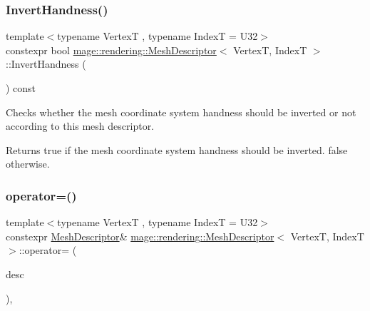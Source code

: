 \subsubsection{\texorpdfstring{Invert\+Handness()}{InvertHandness()}}
{\footnotesize\ttfamily template$<$typename VertexT , typename IndexT  = U32$>$ \\
constexpr bool \hyperlink{classmage_1_1rendering_1_1_mesh_descriptor}{mage\+::rendering\+::\+Mesh\+Descriptor}$<$ VertexT, IndexT $>$\+::Invert\+Handness (\begin{DoxyParamCaption}{ }\end{DoxyParamCaption}) const\hspace{0.3cm}{\ttfamily [noexcept]}}

Checks whether the mesh coordinate system handness should be inverted or not according to this mesh descriptor.

\begin{DoxyReturn}{Returns}
{\ttfamily true} if the mesh coordinate system handness should be inverted. {\ttfamily false} otherwise. 
\end{DoxyReturn}
\hypertarget{classmage_1_1rendering_1_1_mesh_descriptor_a9db3890980a6e0c7ccc315067bc55853}{}\label{classmage_1_1rendering_1_1_mesh_descriptor_a9db3890980a6e0c7ccc315067bc55853} 
\subsubsection{\texorpdfstring{operator=()}{operator=()}\hspace{0.1cm}{\footnotesize\ttfamily [1/2]}}
{\footnotesize\ttfamily template$<$typename VertexT , typename IndexT  = U32$>$ \\
constexpr \hyperlink{classmage_1_1rendering_1_1_mesh_descriptor}{Mesh\+Descriptor}\& \hyperlink{classmage_1_1rendering_1_1_mesh_descriptor}{mage\+::rendering\+::\+Mesh\+Descriptor}$<$ VertexT, IndexT $>$\+::operator= (\begin{DoxyParamCaption}\item[{const \hyperlink{classmage_1_1rendering_1_1_mesh_descriptor}{Mesh\+Descriptor}$<$ VertexT, IndexT $>$ \&}]{desc }\end{DoxyParamCaption})\hspace{0.3cm}{\ttfamily [default]}, {\ttfamily [noexcept]}}

